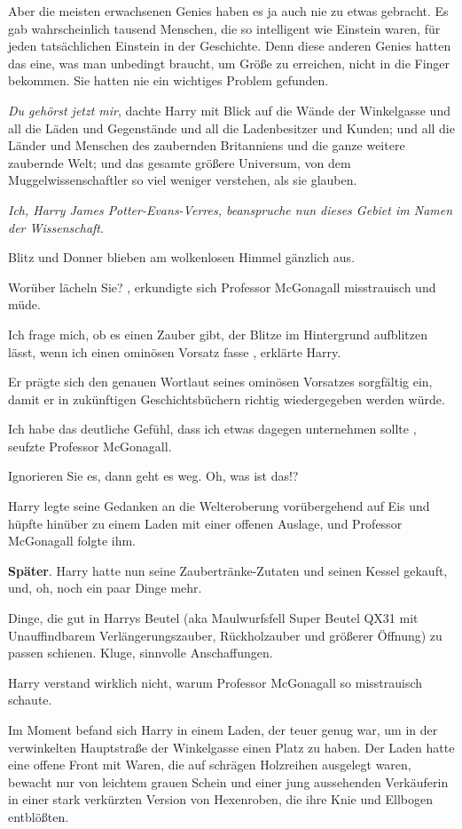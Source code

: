Aber die meisten erwachsenen Genies haben es ja auch nie zu etwas gebracht. Es
gab wahrscheinlich tausend Menschen, die so intelligent wie Einstein waren,
für jeden tatsächlichen Einstein in der Geschichte. Denn diese anderen
Genies hatten das eine, was man unbedingt braucht, um Größe zu erreichen,
nicht in die Finger bekommen. Sie hatten nie ein wichtiges Problem gefunden.

\emph{Du gehörst jetzt mir}, dachte Harry mit Blick auf die Wände der
Winkelgasse und all die Läden und Gegenstände und all die Ladenbesitzer und
Kunden; und all die Länder und Menschen des zaubernden Britanniens und die ganze
weitere zaubernde Welt; und das gesamte größere Universum, von dem
Muggelwissenschaftler so viel weniger verstehen, als sie glauben.

\emph{Ich, Harry James Potter-Evans-Verres, beanspruche nun dieses Gebiet im
Namen der Wissenschaft}.

Blitz und Donner blieben am wolkenlosen Himmel gänzlich aus.

\glqq Worüber lächeln Sie?\grqq{} , erkundigte sich Professor McGonagall
misstrauisch und müde.

\glqq Ich frage mich, ob es einen Zauber gibt, der Blitze im Hintergrund
aufblitzen lässt, wenn ich einen ominösen Vorsatz fasse\grqq{} , erklärte
Harry.

Er prägte sich den genauen Wortlaut seines ominösen Vorsatzes sorgfältig ein,
damit er in zukünftigen Geschichtsbüchern richtig wiedergegeben werden
würde.

\glqq Ich habe das deutliche Gefühl, dass ich etwas dagegen unternehmen
sollte\grqq{} , seufzte Professor McGonagall.

\glqq Ignorieren Sie es, dann geht es weg. Oh, was ist das!?\grqq{}

Harry legte seine Gedanken an die Welteroberung vorübergehend auf Eis und hüpfte
hinüber zu einem Laden mit einer offenen Auslage, und Professor McGonagall
folgte ihm.

\textbf{Später}. Harry hatte nun seine Zaubertränke-Zutaten und seinen
Kessel gekauft, und, oh, noch ein paar Dinge mehr.

Dinge, die gut in Harrys Beutel (aka Maulwurfsfell Super Beutel QX31 mit
Unauffindbarem Verlängerungszauber, Rückholzauber und größerer Öffnung) zu
passen schienen. Kluge, sinnvolle Anschaffungen.

Harry verstand wirklich nicht, warum Professor McGonagall so misstrauisch
schaute.

Im Moment befand sich Harry in einem Laden, der teuer genug war, um in der
verwinkelten Hauptstraße der Winkelgasse einen Platz zu haben. Der Laden
hatte eine offene Front mit Waren, die auf schrägen Holzreihen ausgelegt
waren, bewacht nur von leichtem grauen Schein und einer jung aussehenden
Verkäuferin in einer stark verkürzten Version von Hexenroben, die ihre Knie
und Ellbogen entblößten.

